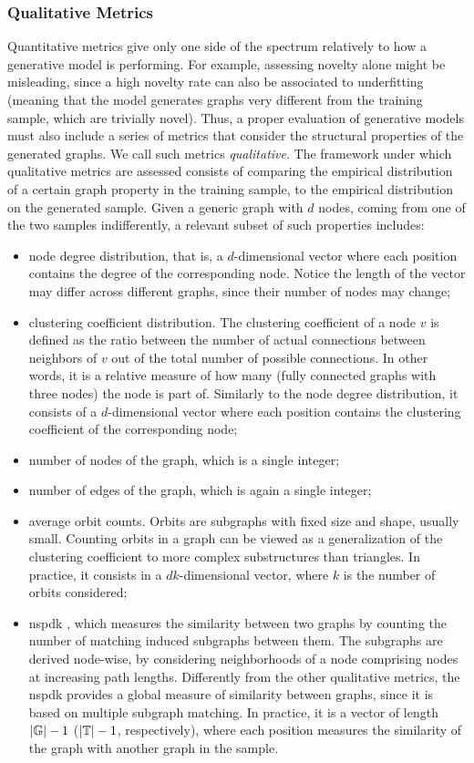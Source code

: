 \subsubsection*{Qualitative Metrics}
Quantitative metrics give only one side of the spectrum relatively to how a generative model is performing. For example, assessing novelty alone might be misleading, since a high novelty rate can also be associated to underfitting (meaning that the model generates graphs very different from the training sample, which are trivially novel). Thus, a proper evaluation of generative models must also include a series of metrics that consider the structural properties of the generated graphs. We call such metrics \emph{qualitative}. The framework under which qualitative metrics are assessed consists of comparing the empirical distribution of a certain graph property in the training sample, to the empirical distribution on the generated sample. Given a generic graph with $d$ nodes, coming from one of the two samples indifferently, a relevant subset of such properties includes:
\begin{itemize}
    \item node degree distribution, that is, a $d$-dimensional vector where each position contains the degree of the corresponding node. Notice the length of the vector may differ across different graphs, since their number of nodes may change;
    \item clustering coefficient distribution. The clustering coefficient of a node $v$ is defined as the ratio between the number of actual connections between neighbors of $v$ out of the total number of possible connections. In other words, it is a relative measure of how many  (fully connected graphs with three nodes) the node is part of. Similarly to the node degree distribution, it consists of a $d$-dimensional vector where each position contains the clustering coefficient of the corresponding node;
    \item number of nodes of the graph, which is a single integer;
    \item number of edges of the graph, which is again a single integer;
    \item average orbit counts. Orbits are subgraphs with fixed size and shape, usually small. Counting orbits in a graph can be viewed as a generalization of the clustering coefficient to more complex substructures than triangles. In practice, it consists in a $dk$-dimensional vector, where $k$ is the number of orbits considered;
    \item \gls{nspdk} \citep{costa2010nspdk}, which measures the similarity between two graphs by counting the number of matching induced subgraphs between them. The subgraphs are derived node-wise, by considering neighborhoods of a node comprising nodes at increasing path lengths. Differently from the other qualitative metrics, the \gls{nspdk} provides a global measure of similarity between graphs, since it is based on multiple subgraph matching. In practice, it is a vector of length $|\mathbb{G}|-1$ ($|\mathbb{T}|-1$, respectively), where each position measures the similarity of the graph with another graph in the sample.
\end{itemize}
